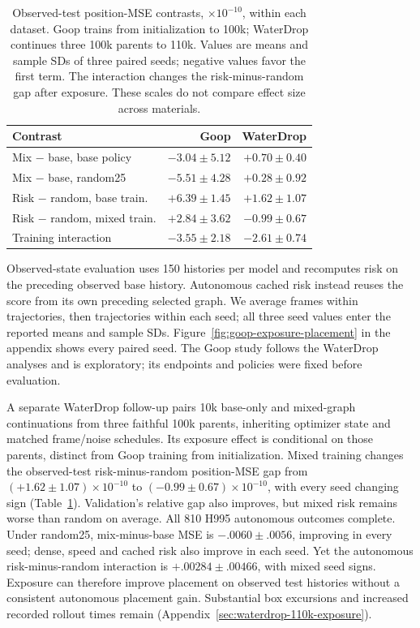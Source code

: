 \begin{table}[t]
\centering\small
\caption{Observed-test position-MSE contrasts, $\times10^{-10}$, within each dataset. Goop trains from initialization to 100k; WaterDrop continues three 100k parents to 110k. Values are means and sample SDs of three paired seeds; negative values favor the first term. The interaction changes the risk-minus-random gap after exposure. These scales do not compare effect size across materials.}
\label{tab:goop-exposure-placement}
\setlength{\tabcolsep}{3pt}
\begin{tabular}{lrr}
\toprule
Contrast & Goop & WaterDrop\\
\midrule
Mix $-$ base, base policy & $-3.04\pm5.12$ & $+0.70\pm0.40$\\
Mix $-$ base, random25 & $-5.51\pm4.28$ & $+0.28\pm0.92$\\
Risk $-$ random, base train. & $+6.39\pm1.45$ & $+1.62\pm1.07$\\
Risk $-$ random, mixed train. & $+2.84\pm3.62$ & $-0.99\pm0.67$\\
Training interaction & $-3.55\pm2.18$ & $-2.61\pm0.74$\\
\bottomrule
\end{tabular}
\end{table}

Observed-state evaluation uses 150 histories per model and recomputes risk on the preceding observed base history. Autonomous cached risk instead reuses the score from its own preceding selected graph. We average frames within trajectories, then trajectories within each seed; all three seed values enter the reported means and sample SDs. Figure~\ref{fig:goop-exposure-placement} in the appendix shows every paired seed. The Goop study follows the WaterDrop analyses and is exploratory; its endpoints and policies were fixed before evaluation.

A separate WaterDrop follow-up pairs 10k base-only and mixed-graph continuations from three faithful 100k parents, inheriting optimizer state and matched frame/noise schedules. Its exposure effect is conditional on those parents, distinct from Goop training from initialization. Mixed training changes the observed-test risk-minus-random position-MSE gap from $(+1.62\pm1.07)\times10^{-10}$ to $(-0.99\pm0.67)\times10^{-10}$, with every seed changing sign (Table~\ref{tab:goop-exposure-placement}). Validation's relative gap also improves, but mixed risk remains worse than random on average. All 810 H995 autonomous outcomes complete. Under random25, mix-minus-base MSE is $-.0060\pm.0056$, improving in every seed; dense, speed and cached risk also improve in each seed. Yet the autonomous risk-minus-random interaction is $+.00284\pm.00466$, with mixed seed signs. Exposure can therefore improve placement on observed test histories without a consistent autonomous placement gain. Substantial box excursions and increased recorded rollout times remain (Appendix~\ref{sec:waterdrop-110k-exposure}).

